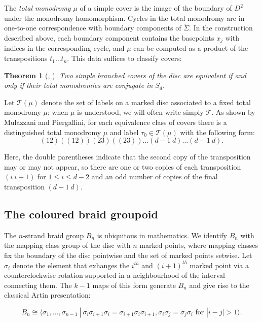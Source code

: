 \documentclass{amsart}
\newtheorem{theorem}{Theorem}[section]
\theoremstyle{definition}
\begin{document}
The \textit{total monodromy} $\mu$ of a simple cover is the image of the boundary of $D^2$ under the monodromy homomorphism.  Cycles in the total monodromy are in one-to-one correspondence with boundary components of $\widetilde{\Sigma}$. In the construction described above, each boundary component contains the basepoints $x_j$ with indices in the corresponding cycle, and $\mu$ can be computed as a product of the transpositions $t_1\dots t_n$.  This data suffices to classify covers:

\begin{theorem}[\cite{MP}, \cite{BE}] Two simple branched covers of the disc are equivalent if and only if their total monodromies are conjugate in $S_d$.
\end{theorem} 


Let $\mathcal{T}(\mu)$ denote the set of labels on a marked disc associated to a fixed total monodromy $\mu$; when $\mu$ is understood, we will often write simply $\mathcal{T}$.  As shown by Mulazzani and Piergallini, for each equivalence class of covers there is a distinguished total monodromy $\mu$ and label $\tau_0 \in \mathcal{T}(\mu)$ with the following form:
\[ (12) ((12)) (23) ((23)) \dots (d-1\   d) \dots (d-1 \ d).\]

Here, the double parentheses indicate that the second copy of the transposition may or may not appear, so there are one or two copies of each transposition $(i \ i+1)$ for $1\leq i\leq d-2$ and an odd number of copies of the final transposition $(d-1\ d)$. 




\subsection{The coloured braid groupoid} 

The $n$-strand braid group $B_n$ is ubiquitous in mathematics. We identify $B_n$ with the mapping class group of the disc with $n$ marked points, where mapping classes fix the boundary of the disc pointwise and the set of marked points setwise.  Let $\sigma_i$ denote the element that exhanges the $i^{th}$ and $(i+1)^{th}$ marked point via a counterclockwise rotation supported in a neighbourhood of the interval connecting them.  The $k-1$ maps of this form generate $B_n$ and give rise to the classical Artin presentation:
 
\begin{equation}\label{def:braidgroup} B_n\cong \langle \sigma_1, \dots, \sigma_{n-1} \ | \ \sigma_i\sigma_{i+1}\sigma_i=\sigma_{i+1}\sigma_i\sigma_{i+1}, \sigma_{i}\sigma_j=\sigma_{j}\sigma_i \text{ for  }|i-j|>1\rangle.\end{equation}
\end{document}
